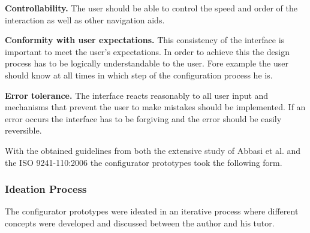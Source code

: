 \documentclass[../medieninformatik-arbeit.tex]{subfiles}
\begin{document}
\textbf{Controllability.} The user should be able to control the speed and order of the interaction as well as other navigation aids.

\textbf{Conformity with user expectations.} This consistency of the interface is important to meet the user's expectations. In order to achieve this the design process has to be logically understandable to the user. Fore example the user should know at all times in which step of the configuration process he is.

\textbf{Error tolerance.} The interface reacts reasonably to all user input and mechanisms that prevent the user to make mistakes should be implemented. If an error occurs the interface has to be forgiving and the error should be easily reversible.

With the obtained guidelines from both the extensive study of Abbasi et al.\cite{abbasi2012s} and the ISO 9241-110:2006\cite{fdis20069241} the configurator prototypes took the following form.

\subsubsection{Ideation Process}
The configurator prototypes were ideated in an iterative process where different concepts were developed and discussed between the author and his tutor. 
\end{document}
